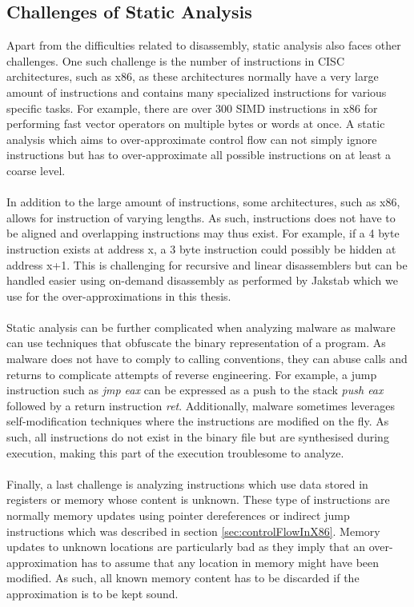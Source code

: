 \documentclass{kththesis}
\newcommand{\fbcomment}[1]{{#1}}
\renewcommand{\fbcomment}[1]{}
\renewcommand{\it}[1]{\textit{#1}}
\begin{document}
\subsection{Challenges of Static Analysis}
\fbcomment{\color{red}Goal: Describe what makes static analysis difficult(For example, instructions of varying sizes).}
Apart from the difficulties related to disassembly, static analysis also faces other challenges. One such challenge is the number of instructions in CISC architectures, such as x86, as these architectures normally have a very large amount of instructions and contains many specialized instructions for various specific tasks\cite{intelX86Manual}. For example, there are over 300 SIMD instructions in x86 for performing fast vector operators on multiple bytes or words at once\cite{vectorInstructions}. A static analysis which aims to over-approximate control flow can not simply ignore instructions but has to over-approximate all possible instructions on at least a coarse level. 
\\ \\
In addition to the large amount of instructions, some architectures, such as x86, allows for instruction of varying lengths. As such, instructions does not have to be aligned and overlapping instructions may thus exist. For example, if a 4 byte instruction exists at address x, a 3 byte instruction could possibly be hidden at address x+1. This is challenging for recursive and linear disassemblers but can be handled easier using on-demand disassembly as performed by Jakstab which we use for the over-approximations in this thesis. 
\\ \\
Static analysis can be further complicated when analyzing malware as malware can use techniques that obfuscate the binary representation of a program\cite{StaticDisAndCodeAnal}. As malware does not have to comply to calling conventions, they can abuse calls and returns to complicate attempts of reverse engineering. For example, a jump instruction such as \it{jmp eax} can be expressed as a push to the stack \it{push eax} followed by a return instruction \it{ret}. Additionally, malware sometimes leverages self-modification techniques where the instructions are modified on the fly. As such, all instructions do not exist in the binary file but are synthesised during execution, making this part of the execution troublesome to analyze.
\\ \\
Finally, a last challenge is analyzing instructions which use data stored in registers or memory whose content is unknown. These type of instructions are normally memory updates using pointer dereferences or indirect jump instructions which was described in section \ref{sec:controlFlowInX86}\cite{Jakstab}. Memory updates to unknown locations are particularly bad as they imply that an over-approximation has to assume that any location in memory might have been modified. As such, all known memory content has to be discarded if the approximation is to be kept sound.
\end{document}
